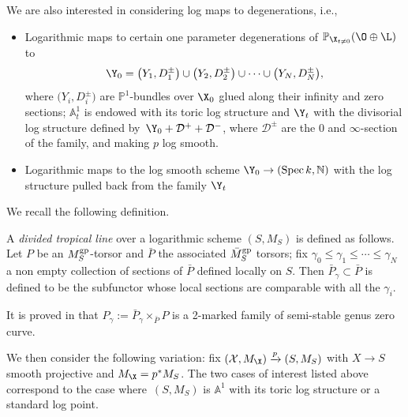 We are also interested in considering log maps to degenerations, i.e.,
\begin{itemize}\itemsep=0pt
\item Logarithmic maps to  certain one parameter degenerations of $\mathbb P_{\X_{t\neq 0}}(\O\oplus\L)$ to
\[\Y_0=\bigl(Y_1,D_1^\pm\bigr)\cup\bigl(Y_2,D_2^\pm\bigr)\cup\dots\cup \bigl(Y_N,D_N^\pm\bigr),
\]
where $\bigl(Y_i,D^{\pm}_i\bigr)$ are $\mathbb P^1$-bundles over $\X_0$ glued along their infinity and zero sections;
$\mathbb A^1_t$ is endowed with its toric log structure and $\Y_t$ with the divisorial log structure defined by~${\Y_0+\mathcal{D}^+ +\mathcal{D}^-}$, where $\mathcal{D}^\pm$ are the $0$ and $\infty$-section of the family, and making $p$ log smooth.
\item Logarithmic maps to the log smooth scheme $\Y_0\to(\operatorname{Spec} k,\mathbb N)$ with the log structure pulled back from the family $\Y_t$
\end{itemize}

We recall the following definition.

\begin{defi}
 A \emph{divided tropical line} over a logarithmic scheme $(S,M_S)$ is defined as follows. Let $P$ be an $M_S^{\rm gp}$-torsor and $\bar{P}$ the associated $\bar{M}_S^{\rm gp}$ torsors; fix $\gamma_0\leq\gamma_1\leq\cdots\leq\gamma_N$ a non empty collection of sections of $\bar{P}$ defined locally on $S$. Then $\bar{P}_{\gamma}\subset\bar{P}$ is defined to be the subfunctor whose local sections are comparable with all the $\gamma_i$.
\end{defi}
It is proved in \cite[Proposition~5.2.4]{marcuswiselog} that $P_{\gamma}:=\bar{P}_{\gamma}\times_{\bar{P}} P$ is a 2-marked family of semi-stable genus zero curve.



We then consider the following variation: fix $(\mathcal X, M_{\X})\xrightarrow{p} (S,M_S)$ with $X\to S$ smooth projective and $M_{\X}=p^*M_S$.
The two cases of interest listed above correspond to the case where~$(S,M_S)$ is $\mathbb A^1$ with its toric log structure or a standard log point.

